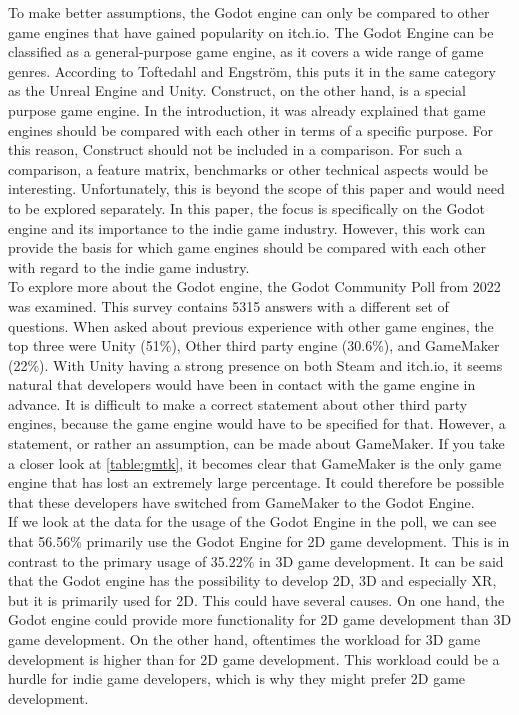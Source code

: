 To make better assumptions, the Godot engine can only be compared to other game engines that have gained popularity on itch.io.
The Godot Engine can be classified as a general-purpose game engine, as it covers a wide range of game genres.
According to Toftedahl and Engström, this puts it in the same category as the Unreal Engine and Unity.
Construct, on the other hand, is a special purpose game engine.
In the introduction, it was already explained that game engines should be compared with each other in terms of a specific purpose.
For this reason, Construct should not be included in a comparison.
For such a comparison, a feature matrix, benchmarks or other technical aspects would be interesting.
Unfortunately, this is beyond the scope of this paper and would need to be explored separately.
In this paper, the focus is specifically on the Godot engine and its importance to the indie game industry.
However, this work can provide the basis for which game engines should be compared with each other with regard to the indie game industry.\\

To explore more about the Godot engine, the Godot Community Poll from 2022 was examined\cite{godot-poll-results}.
This survey contains 5315 answers with a different set of questions.
When asked about previous experience with other game engines, the top three were Unity (51\%), Other third party engine (30.6\%), and GameMaker (22\%).
With Unity having a strong presence on both Steam and itch.io, it seems natural that developers would have been in contact with the game engine in advance.
It is difficult to make a correct statement about other third party engines, because the game engine would have to be specified for that.
However, a statement, or rather an assumption, can be made about GameMaker.
If you take a closer look at \autoref{table:gmtk}, it becomes clear that GameMaker is the only game engine that has lost an extremely large percentage.
It could therefore be possible that these developers have switched from GameMaker to the Godot Engine.\\

If we look at the data for the usage of the Godot Engine in the poll, we can see that 56.56\% primarily use the Godot Engine for 2D game development.
This is in contrast to the primary usage of 35.22\% in 3D game development.
It can be said that the Godot engine has the possibility to develop 2D, 3D and especially XR, but it is primarily used for 2D.
This could have several causes.
On one hand, the Godot engine could provide more functionality for 2D game development than 3D game development.
On the other hand, oftentimes the workload for 3D game development is higher than for 2D game development.
This workload could be a hurdle for indie game developers, which is why they might prefer 2D game development.\\

